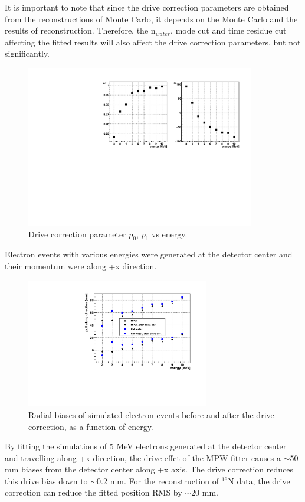 It is important to note that since the drive correction parameters are obtained from the reconstructions of Monte Carlo, it depends on the Monte Carlo and the results of reconstruction. Therefore, the n$_{water}$, mode cut and time residue cut affecting the fitted results will also affect the drive correction parameters, but not significantly.


\begin{figure}[!htb]
	\centering
	\includegraphics[width=10cm]{pullParVsEnergy.pdf}
	\caption{ Drive correction parameter $p_0$, $p_1$ vs energy.}
	\label{pullParVsEnergy}
\end{figure}

Electron events with various energies were generated at the detector center and their momentum were along +x direction. 

\begin{figure}[!htb]
	\centering
	\includegraphics[width=8cm]{pullEffectVsEnergy.pdf}
	\caption{ Radial biases of simulated electron events before and after the drive correction, as a function of energy.}
	\label{drivecorVsEnergy}
\end{figure}


By fitting the simulations of 5 MeV electrons generated at the detector center and travelling along +x direction, the drive effct of the MPW fitter causes a $\sim$50 mm biases from the detector center along +x axis. The drive correction reduces this drive bias down to $\sim$0.2 mm. For the reconstruction of $^{16}$N data, the drive correction can reduce the fitted position RMS by $\sim$20 mm.

